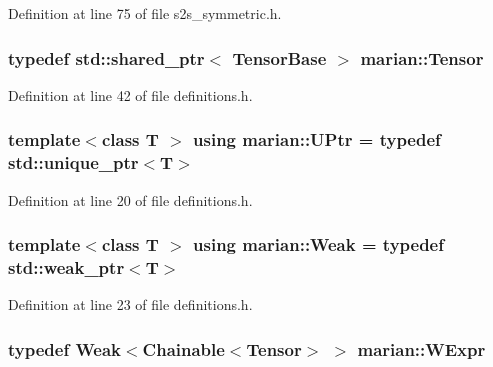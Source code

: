 Definition at line 75 of file s2s\+\_\+symmetric.\+h.

\subsubsection[{\texorpdfstring{Tensor}{Tensor}}]{\setlength{\rightskip}{0pt plus 5cm}typedef std\+::shared\+\_\+ptr$<$ {\bf Tensor\+Base} $>$ {\bf marian\+::\+Tensor}}\hypertarget{namespacemarian_a88b71ec34bb354564cddc24eb80f7e14}{}\label{namespacemarian_a88b71ec34bb354564cddc24eb80f7e14}


Definition at line 42 of file definitions.\+h.

\subsubsection[{\texorpdfstring{U\+Ptr}{UPtr}}]{\setlength{\rightskip}{0pt plus 5cm}template$<$class T $>$ using {\bf marian\+::\+U\+Ptr} = typedef std\+::unique\+\_\+ptr$<$T$>$}\hypertarget{namespacemarian_aef1c1bbe14b70285b1e8f7653f134cb1}{}\label{namespacemarian_aef1c1bbe14b70285b1e8f7653f134cb1}


Definition at line 20 of file definitions.\+h.

\subsubsection[{\texorpdfstring{Weak}{Weak}}]{\setlength{\rightskip}{0pt plus 5cm}template$<$class T $>$ using {\bf marian\+::\+Weak} = typedef std\+::weak\+\_\+ptr$<$T$>$}\hypertarget{namespacemarian_acde6307b95538fbf82548c2e1108ccf4}{}\label{namespacemarian_acde6307b95538fbf82548c2e1108ccf4}


Definition at line 23 of file definitions.\+h.

\subsubsection[{\texorpdfstring{W\+Expr}{WExpr}}]{\setlength{\rightskip}{0pt plus 5cm}typedef {\bf Weak}$<${\bf Chainable}$<${\bf Tensor}$>$ $>$ {\bf marian\+::\+W\+Expr}}\hypertarget{namespacemarian_a2b926a792e343705a2eb5224771f47de}{}\label{namespacemarian_a2b926a792e343705a2eb5224771f47de}


